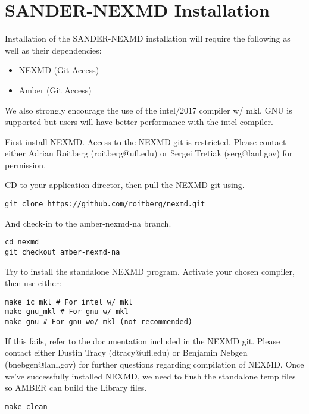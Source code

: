 \documentclass[11pt]{article}
\author{dustin}
\date{\today}
\title{}
\begin{document}
\tableofcontents

\section{SANDER-NEXMD Installation}
\label{sec:org5b20f8a}
Installation of the SANDER-NEXMD installation will require the following as well
as their dependencies:

\begin{itemize}
\item NEXMD (Git Access)
\item Amber (Git Access)
\end{itemize}

We also strongly encourage the use of the intel/2017 compiler w/ mkl. GNU is
supported but users will have better performance with the intel compiler.

First install NEXMD. Access to the NEXMD git is restricted. Please contact
either Adrian Roitberg (roitberg@ufl.edu) or Sergei Tretiak (serg@lanl.gov) for
permission.

CD to your application director, then pull the NEXMD git using. 

\begin{verbatim}
git clone https://github.com/roitberg/nexmd.git
\end{verbatim}


And check-in to the amber-nexmd-na branch.

\begin{verbatim}
cd nexmd 
git checkout amber-nexmd-na 
\end{verbatim}

Try to install the standalone NEXMD program. Activate your chosen compiler, then use either: 

\begin{verbatim}
make ic_mkl # For intel w/ mkl 
make gnu_mkl # For gnu w/ mkl 
make gnu # For gnu wo/ mkl (not recommended) 
\end{verbatim}

If this fails, refer to the documentation included in the NEXMD git. Please contact either Dustin Tracy (dtracy@ufl.edu) or Benjamin Nebgen (bnebgen@lanl.gov) for further questions regarding compilation of NEXMD. Once we’ve successfully installed NEXMD, we need to flush the standalone temp files so AMBER can build the Library files. 

\begin{verbatim}
make clean 
\end{verbatim}
\end{document}
